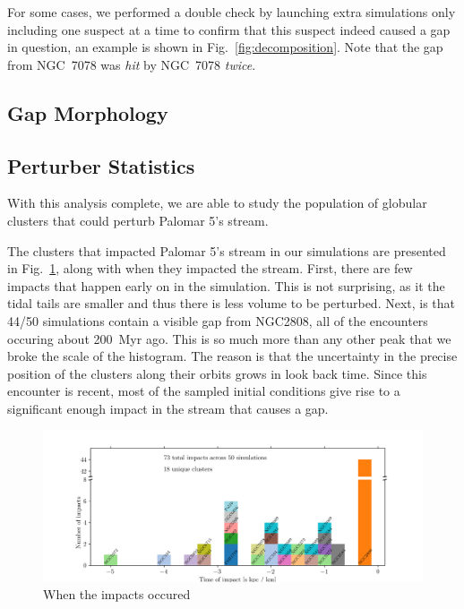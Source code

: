\documentclass[draft]{aa}
\begin{document}
 For some cases, we performed a double check by launching extra simulations only including one suspect at a time to confirm that this suspect indeed caused a gap in question, an example is shown in Fig.~\ref{fig:decomposition}. Note that the gap from NGC~7078 was \textit{hit} by NGC~7078 \textit{twice}. 


 \subsection*{Gap Morphology}
 
 \subsection*{Perturber Statistics}
  With this analysis complete, we are able to study the population of globular clusters that could perturb Palomar 5's stream. 
  
  The clusters that impacted Palomar 5's stream in our simulations are presented in Fig.~\ref{fig:histogram_impact_time}, along with when they impacted the stream. First, there are few impacts that happen early on in the simulation. This is not surprising, as it the tidal tails are smaller and thus there is less volume to be perturbed. Next, is that 44/50 simulations contain a visible gap from NGC2808, all of the encounters occuring about 200~Myr ago. This is so much more than any other peak that we broke the scale of the histogram. The reason is that the uncertainty in the precise position of the clusters along their orbits grows in look back time. Since this encounter is recent, most of the sampled initial conditions give rise to a significant enough impact in the stream that causes a gap.

  \begin{figure}
    \centering
    \includegraphics[width=\linewidth]{histogram_impact_time.png}
    \caption{When the impacts occured}
    \label{fig:histogram_impact_time}
    \end{figure}    
  
\end{document}

